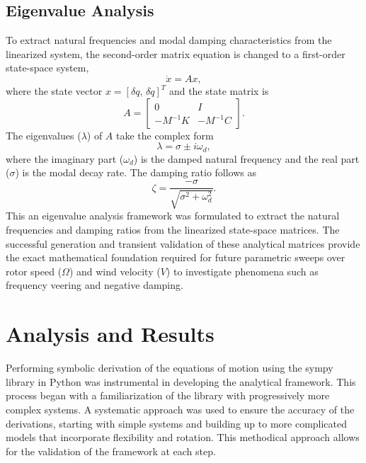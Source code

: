 \documentclass[final,onecolumn]{IEEEtran}
\begin{document}
\subsection{Eigenvalue Analysis}
To extract natural frequencies and modal damping characteristics from the linearized system, the second-order matrix equation is changed to a first-order state-space system,
\begin{equation}
    \dot{x} = Ax,
\end{equation}
where the state vector $x = [\delta q,\, \delta\dot{q}]^T$ and the state matrix is
\begin{equation}
    A = \begin{bmatrix} 0 & I \\ -M^{-1}K & -M^{-1}C \end{bmatrix}.
\end{equation}
The eigenvalues ($\lambda$) of $A$ take the complex form
\begin{equation}
    \lambda = \sigma \pm i\omega_d,
\end{equation}
where the imaginary part ($\omega_d$) is the damped natural frequency and the real part ($\sigma$) is the modal decay rate. The damping ratio follows as
\begin{equation}
    \zeta = \frac{-\sigma}{\sqrt{\sigma^2 + \omega_d^2}}.
\end{equation}
This an eigenvalue analysis framework was formulated to extract the natural frequencies and damping ratios from the linearized state-space matrices. The successful generation and transient validation of these analytical matrices provide the exact mathematical foundation required for future parametric sweeps over rotor speed ($\Omega$) and wind velocity ($V$) to investigate phenomena such as frequency veering and negative damping.

\section{Analysis and Results}\label{sec:analysis}
Performing symbolic derivation of the equations of motion using the sympy library in Python was instrumental in developing the analytical framework. This process began with a familiarization of the library with progressively more complex systems. A systematic approach was used to ensure the accuracy of the derivations, starting with simple systems and building up to more complicated models that incorporate flexibility and rotation. This methodical approach allows for the validation of the framework at each step.
\end{document}
